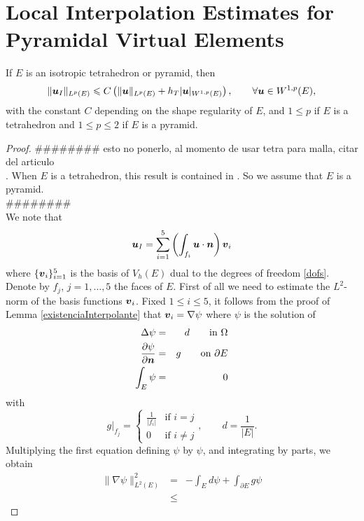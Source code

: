 \section{Local Interpolation Estimates for Pyramidal Virtual Elements}

\begin{theorem}
If $E$ is an isotropic tetrahedron or pyramid, then  
\begin{equation}\label{estab2}
\|\boldsymbol{u}_I\|_{L^p(E)}\leqslant C\left(\|\boldsymbol{u}\|_{L^p(E)}+ h_T|\boldsymbol{u}|_{W^{1,p}(E)}\right), \qquad \forall \boldsymbol{u}\in W^{1,p}(E),
\end{equation}
with the constant $C$ depending on the shape regularity of $E$, and $1\leqslant p$ if $E$ is a tetrahedron and $1\leqslant p\leqslant 2$ if $E$ is a pyramid.
\end{theorem}
\begin{proof}
{\color{blue}\#\#\#\#\#\#\#\# esto no ponerlo, al momento de usar tetra para
malla, citar del articulo\\.}
When $E$ is a tetrahedron, this result is contained in \cite{aadl}. So we assume that $E$ is a pyramid.\\ 
{\color{blue}\#\#\#\#\#\#\#\#\\}
We note that 
\begin{equation}\label{estab2:eq1}
\boldsymbol{u}_I=\sum_{i=1}^5 \left(\int_{f_i}\boldsymbol{u}\cdot \boldsymbol{n}\right)\boldsymbol{v}_i
\end{equation}
where $\{\boldsymbol{v}_i\}_{i=1}^5$ is the basis of $V_h(E)$ dual to the degrees of freedom
\ref{dofs}. Denote by $f_j$, $j=1,\ldots,5$ the faces of $E$. First of all we need to estimate the $L^2$-norm of the basis functions $\boldsymbol{v}_i$. Fixed $1\leqslant i\leqslant 5$, it follows from the proof of Lemma \ref{existenciaInterpolante} that $\boldsymbol{v}_i=\nabla \psi$ where $\psi$ is the solution of
\begin{eqnarray*}
\Delta\psi&=&d\qquad\mbox{in }\Omega\\ \frac{\partial\psi}{\partial\boldsymbol{n}}&=&g\qquad\mbox{on }\partial E\\ \int_E\psi&=&0
\end{eqnarray*}
with
\[
g|_{f_j}=\left\{\begin{array}{cl}\frac1{|f_i|}&\mbox{if }i=j\\0&\mbox{if }i\ne j\end{array}\right., \qquad d=\frac1{|E|}.
\]
Multiplying the first equation defining $\psi$ by $\psi$, and integrating by parts, we obtain
\begin{eqnarray*}
\|\nabla\psi\|_{L^2(E)}^2 &=& -\int_Ed\psi + \int_{\partial E}g\psi\\ &\leqslant & 

\end{eqnarray*}
\end{proof}
